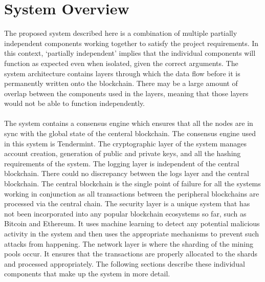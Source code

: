 \documentclass[a4paper,twoside,phd]{BYUPhys}
\begin{document}
\section{System Overview}
The proposed system described here is a combination of multiple partially independent components working together to satisfy the project requirements. In this context, `partially independent' implies that the individual components will function as expected even when isolated, given the correct arguments. The system architecture contains layers through which the data flow before it is permanently written onto the blockchain. There may be a large amount of overlap between the components used in the layers, meaning that those layers would not be able to function independently. 
\\
\\
The system contains a consensus engine which ensures that all the nodes are in sync with the global state of the centeral blockchain. The consensus engine used in this system is Tendermint. The cryptographic layer of the system manages account creation, generation of public and private keys, and all the hashing requirements of the system. The logging layer is independent of the central blockchain. There could no discrepancy between the logs layer and the central blockchain. The central blockchain is the single point of failure for all the systems working in conjunction as all transactions between the peripheral blockchains are processed via the central chain. The security layer is a unique system that has not been incorporated into any popular blockchain ecosystems so far, such as Bitcoin and Ethereum. It uses machine learning to detect any potential malicious activity in the system and then uses the appropriate mechanisms to prevent such attacks from happening. The network layer is where the sharding of the mining pools occur. It ensures that the transactions are properly allocated to the shards and processed appropriately. The following sections describe these individual components that make up the system in more detail.
\end{document}
